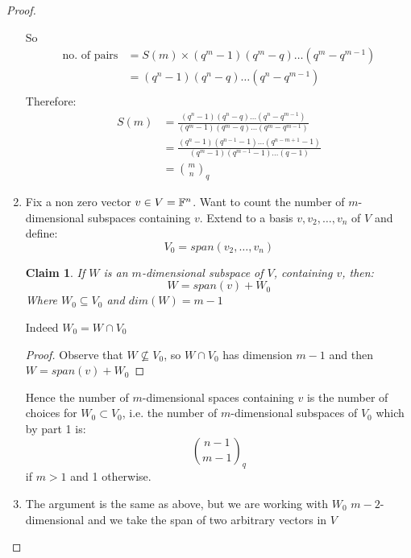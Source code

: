 \documentclass[]{article}
\newtheorem*{clm}{Claim}
\theoremstyle{definition}
\theoremstyle{remark}
\numberwithin{equation}{section}
\begin{document}
\begin{proof}
\begin{enumerate}
					So
					\begin{align*}
						\text{no. of pairs} &= S(m) \times (q^m -1)(q^m - q)\hdots (q^m - q^{m-1})\\
											&= (q^n -1)(q^n -q) \hdots (q^n - q^{m-1})\\
					\end{align*}
					Therefore:
					\begin{align*}
						S(m) &= \frac{(q^n -1)(q^n -q) \hdots (q^n - q^{m-1})}{(q^m -1)(q^m - q)\hdots (q^m - q^{m-1})}\\
						&= \frac{(q^n -1)(q^{n-1} -1) \hdots (q^{n-m+1} - 1)}{(q^m -1)(q^{m-1} - 1)\hdots (q -1)}\\
						&= \binom{m}{n}_q
					\end{align*}

					\item Fix a non zero vector $v \in V = \mathbb F^n$. Want to count the number of $m$-dimensional subspaces containing $v$. Extend to a basis $v, v_2, \hdots, v_n$ of $V$ and define:
					\[
						V_0 = span(v_2, \hdots, v_n)
					\]
					\begin{clm}
						If $W$ is an $m$-dimensional subspace of $V$, containing $v$, then:
						\[
							W = span(v) + W_0
						\]
						Where $W_0 \subseteq V_0$ and $dim(W) = m-1$
					\end{clm}
					Indeed $W_0 = W \cap V_0$
					\begin{proof}Observe that $W \nsubseteq V_0$, so $W \cap V_0$ has dimension $m-1$ and then $W = span(v) + W_0$
					\end{proof}

					Hence the number of $m$-dimensional spaces containing $v$ is the number of choices for $W_0 \subset V_0$, i.e. the number of $m$-dimensional subspaces of $V_0$ which by part 1 is:
					\[
						\binom{n-1}{m-1}_q
					\] if $m > 1$ and 1 otherwise.

					\item The argument is the same as above, but we are working with $W_0$ $m-2$-dimensional and we take the span of two arbitrary vectors in $V$
				\end{enumerate}
			\end{proof}
\end{document}
